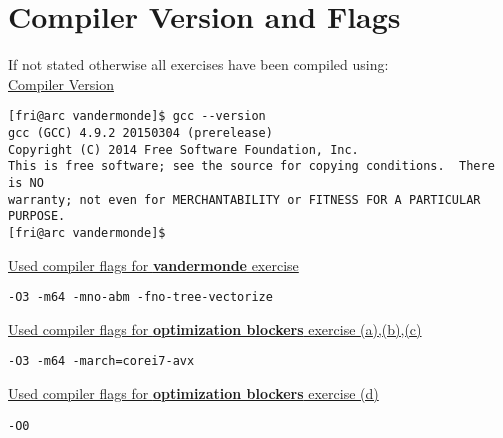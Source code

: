 \documentclass[10pt,a4paper,oneside,notitlepage]{report}
\begin{document}
\newpage

\section*{Compiler Version and Flags}
\label{compiler_version}
If not stated otherwise all exercises have been compiled using: \\ 

\underline{Compiler Version}
\begin{verbatim}
[fri@arc vandermonde]$ gcc --version
gcc (GCC) 4.9.2 20150304 (prerelease)
Copyright (C) 2014 Free Software Foundation, Inc.
This is free software; see the source for copying conditions.  There is NO
warranty; not even for MERCHANTABILITY or FITNESS FOR A PARTICULAR PURPOSE.
[fri@arc vandermonde]$
\end{verbatim}

\underline{Used compiler flags for \textbf{vandermonde} exercise} 
\begin{verbatim}
-O3 -m64 -mno-abm -fno-tree-vectorize
\end{verbatim}

\underline{Used compiler flags for \textbf{optimization blockers} exercise (a),(b),(c)} 
\begin{verbatim}
-O3 -m64 -march=corei7-avx
\end{verbatim}

\underline{Used compiler flags for \textbf{optimization blockers} exercise (d)} 
\begin{verbatim}
-O0
\end{verbatim}
\end{document}
